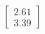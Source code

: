 \documentclass[preview]{standalone}
\begin{document}
\begin{align*}
\begin{bmatrix} 2.61 \\ 3.39 \end{bmatrix}
\end{align*}
\end{document}
